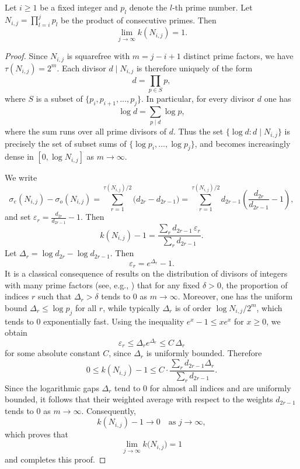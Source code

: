 \documentclass[12pt,reqno]{article}
\begin{document}
\begin{theorem}
Let $i \ge 1$ be a fixed integer and $p_l$ denote the $l$-th prime number. Let 
$N_{i, j} = \prod_{l=i}^{j} p_l$ be the product of consecutive primes. Then 
\[ \lim_{j \to \infty} k(N_{i, j}) = 1 .\]
\end{theorem}

\begin{proof}
Since $N_{i, j}$ is squarefree with $m=j - i + 1$ distinct prime factors, we have $\tau(N_{i, j}) = 2^m$. Each divisor $d \mid N_{i, j}$ is therefore uniquely of the form
\[
d = \prod_{p \in S} p,
\]
where $S$ is a subset of $\{p_i, p_{i+1}, \dots, p_j\}$. In particular, for every divisor $d$ one has
\[
\log d = \sum_{p \mid d} \log p,
\]
where the sum runs over all prime divisors of $d$. Thus the set $\{\log d : d \mid N_{i, j}\}$ is precisely the set of subset sums of $\{\log p_i, \dots, \log p_j\}$, and becomes increasingly dense in $[0,\log N_{i, j}]$ as $m \to \infty$.

We write
\[
\sigma_e(N_{i, j}) - \sigma_o(N_{i, j})
= \sum_{r=1}^{\tau(N_{i, j})/2} \bigl(d_{2r} - d_{2r-1}\bigr)
= \sum_{r=1}^{\tau(N_{i, j})/2} d_{2r-1}\left(\frac{d_{2r}}{d_{2r-1}} - 1\right),
\]
and set $\varepsilon_{r} = \frac{d_{2r}}{d_{2r-1}} - 1$. Then
\[
k(N_{i, j}) - 1
= \frac{\sum_{r} d_{2r-1}\,\varepsilon_{r}}{\sum_{r} d_{2r-1}}.
\]
Let $\Delta_{r} = \log d_{2r} - \log d_{2r-1}$. Then
\[
\varepsilon_{r} = e^{\Delta_{r}} - 1.
\]
It is a classical consequence of results on the distribution of divisors of integers with many prime factors (see, e.g., \cite{6}) that for any fixed $\delta > 0$, the proportion of indices $r$ such that $\Delta_{r} > \delta$ tends to $0$ as $m \to \infty$. Moreover, one has the uniform bound $\Delta_{r} \le \log p_j$ for all $r$, while typically $\Delta_{r}$ is of order $\log N_{i, j} / 2^m$, which tends to $0$ exponentially fast.
Using the inequality $e^x - 1 \le x e^x$ for $x \ge 0$, we obtain
\[
\varepsilon_{r} \le \Delta_{r} e^{\Delta_{r}} \le C\, \Delta_{r}
\]
for some absolute constant $C$, since $\Delta_{r}$ is uniformly bounded. Therefore
\[
0 \le k(N_{i, j}) - 1
\le C \cdot \frac{\sum_{r} d_{2r-1} \Delta_{r}}{\sum_{r} d_{2r-1}}.
\]
Since the logarithmic gaps $\Delta_{r}$ tend to $0$ for almost all indices and are uniformly bounded, it follows that their weighted average with respect to the weights $d_{2r-1}$ tends to $0$ as $m \to \infty$. Consequently,
\[
k(N_{i, j}) - 1 \longrightarrow 0 \quad \text{as } j \to \infty,
\]
which proves that
\[
\lim_{j \to \infty} k\bigl(N_{i, j}\bigr) = 1
\]
and completes this proof. 
\end{proof}
\end{document}
